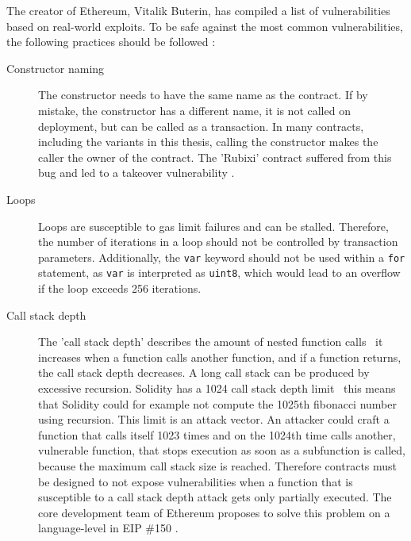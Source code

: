 The creator of Ethereum, Vitalik Buterin, has compiled a list of vulnerabilities based on real-world exploits. To be safe against the most common vulnerabilities, the following practices should be followed \cite{ThinkingAboutSmartContractSecurity}:

\begin{description}
    \item[Constructor naming] The constructor needs to have the same name as the contract. If by mistake, the constructor has a different name, it is not called on deployment, but can be called as a transaction. In many contracts, including the variants in this thesis, calling the constructor makes the caller the owner of the contract. The 'Rubixi' contract suffered from this bug and led to a takeover vulnerability \cite{ThinkingAboutSmartContractSecurity}.
    \item[Loops] Loops are susceptible to gas limit failures and can be stalled. Therefore, the number of iterations in a loop should not be controlled by transaction parameters. Additionally, the \texttt{var} keyword should not be used within a \texttt{for} statement, as \texttt{var} is interpreted as \texttt{uint8}, which would lead to an overflow if the loop exceeds 256 iterations.
    \item[Call stack depth] The 'call stack depth' describes the amount of nested function calls \textemdash\ it increases when a function calls another function, and if a function returns, the call stack depth decreases. A long call stack can be produced by excessive recursion. Solidity has a 1024 call stack depth limit \textemdash\  this means that Solidity could for example not compute the 1025th fibonacci number using recursion. This limit is an attack vector. An attacker could craft a function that calls itself 1023 times and on the 1024th time calls another, vulnerable function, that stops execution as soon as a subfunction is called, because the maximum call stack size is reached. Therefore contracts must be designed to not expose vulnerabilities when a function that is susceptible to a call stack depth attack gets only partially executed. The core development team of Ethereum proposes to solve this problem on a language-level in EIP \#150 \cite{EIP150}.

\end{description}
